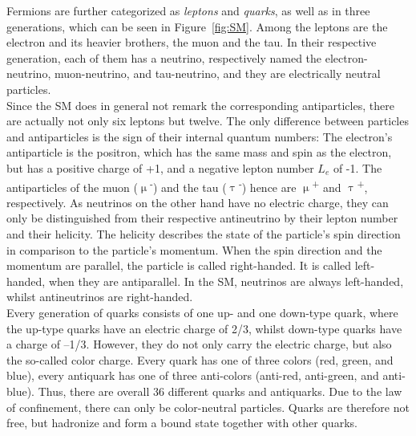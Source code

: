 Fermions are further categorized as \textit{leptons} and \textit{quarks}, as well as in three generations, which can be seen in Figure~\ref{fig:SM}.
Among the leptons are the electron and its heavier brothers, the muon and the tau.
In their respective generation, each of them has a neutrino, respectively named the electron-neutrino, muon-neutrino, and tau-neutrino, and they are electrically neutral particles.\\
Since the SM does in general not remark the corresponding antiparticles, there are actually not only six leptons but twelve.
The only difference between particles and antiparticles is the sign of their internal quantum numbers:
The electron's antiparticle is the positron, which has the same mass and spin as the electron, but has a positive charge of +1, and a negative lepton number $L_e$ of -1.
The antiparticles of the muon ($\upmu$\textsuperscript{-}) and the tau ($\uptau$\textsuperscript{-}) hence are $\upmu$\textsuperscript{+} and $\uptau$\textsuperscript{+}, respectively.
As neutrinos on the other hand have no electric charge, they can only be distinguished from their respective antineutrino by their lepton number and their helicity.
The helicity describes the state of the particle's spin direction in comparison to the particle's momentum.
When the spin direction and the momentum are parallel, the particle is called right-handed.
It is called left-handed, when they are antiparallel.
In the SM, neutrinos are always left-handed, whilst antineutrinos are right-handed.\\
Every generation of quarks consists of one up- and one down-type quark, where the up-type quarks have an electric charge of 2/3, whilst down-type quarks have a charge of --1/3.
However, they do not only carry the electric charge, but also the so-called color charge.
Every quark has one of three colors (red, green, and blue), every antiquark has one of three anti-colors (anti-red, anti-green, and anti-blue).
Thus, there are overall 36 different quarks and antiquarks.
Due to the law of confinement, there can only be color-neutral particles.
Quarks are therefore not free, but hadronize and form a bound state together with other quarks.
